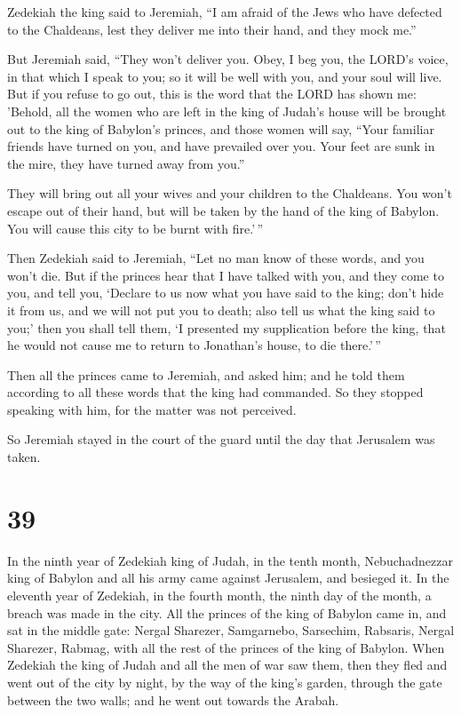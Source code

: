  Zedekiah the king said to Jeremiah, ``I am afraid of the
Jews who have defected to the Chaldeans, lest they deliver me into their
hand, and they mock me.''

 But Jeremiah said, ``They won't deliver you. Obey, I beg
you, the LORD's voice, in that which I speak to you; so it will be well
with you, and your soul will live.  But if you refuse to
go out, this is the word that the LORD has shown me: 
'Behold, all the women who are left in the king of Judah's house will be
brought out to the king of Babylon's princes, and those women will say,
``Your familiar friends have turned on you, and have prevailed over you.
Your feet are sunk in the mire, they have turned away from you.''

 They will bring out all your wives and your children to
the Chaldeans. You won't escape out of their hand, but will be taken by
the hand of the king of Babylon. You will cause this city to be burnt
with fire.'\,''

 Then Zedekiah said to Jeremiah, ``Let no man know of
these words, and you won't die.  But if the princes hear
that I have talked with you, and they come to you, and tell you,
`Declare to us now what you have said to the king; don't hide it from
us, and we will not put you to death; also tell us what the king said to
you;'  then you shall tell them, `I presented my
supplication before the king, that he would not cause me to return to
Jonathan's house, to die there.'\,''

 Then all the princes came to Jeremiah, and asked him;
and he told them according to all these words that the king had
commanded. So they stopped speaking with him, for the matter was not
perceived.

 So Jeremiah stayed in the court of the guard until the
day that Jerusalem was taken.

\hypertarget{section-38}{%
\section{39}\label{section-38}}

 In the ninth year of Zedekiah king of Judah, in the tenth
month, Nebuchadnezzar king of Babylon and all his army came against
Jerusalem, and besieged it.  In the eleventh year of
Zedekiah, in the fourth month, the ninth day of the month, a breach was
made in the city.  All the princes of the king of Babylon
came in, and sat in the middle gate: Nergal Sharezer, Samgarnebo,
Sarsechim, Rabsaris, Nergal Sharezer, Rabmag, with all the rest of the
princes of the king of Babylon.  When Zedekiah the king of
Judah and all the men of war saw them, then they fled and went out of
the city by night, by the way of the king's garden, through the gate
between the two walls; and he went out towards the Arabah.

